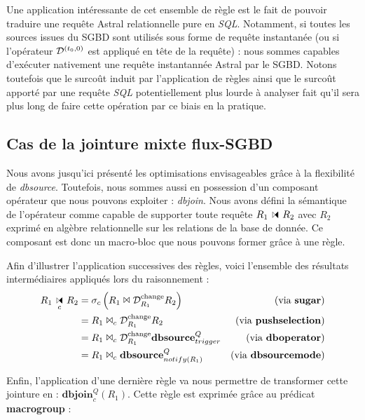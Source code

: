 Une application intéressante de cet ensemble de règle est le fait de pouvoir traduire une requête Astral relationnelle pure en \textit{SQL}. Notamment, si toutes les sources issues du SGBD sont utilisés sous forme de requête instantanée (ou si l'opérateur $\mathcal{D}^{(t_0,0)}$ est appliqué en tête de la requête) : nous sommes capables d'exécuter nativement une requête instantannée Astral par le SGBD. Notons toutefois que le surcoût induit par l'application de règles ainsi que le surcoût apporté par une requête \textit{SQL} potentiellement plus lourde à analyser fait qu'il sera plus long de faire cette opération par ce biais en la pratique.

\subsection{Cas de la jointure mixte flux-SGBD}\label{sec:contrib:asteroid:reecriture:join}
Nous avons jusqu'ici présenté les optimisations envisageables grâce à la flexibilité de \textit{dbsource}. Toutefois, nous sommes aussi en possession d'un composant opérateur que nous pouvons exploiter : \textit{dbjoin}. Nous avons défini la sémantique de l'opérateur comme capable de supporter toute requête $R_1\ssjoin R_2$ avec $R_2$ exprimé en algèbre relationnelle sur les relations de la base de donnée. Ce composant est donc un macro-bloc que nous pouvons former grâce à une règle.

Afin d'illustrer l'application successives des règles, voici l'ensemble des résultats intermédiaires appliqués lors du raisonnement :
\begin{align*} 
R_1\ssjoin_c R_2 &= \sigma_c \left(R_1 \Join \D^{\mathrm{change}}_{R_1} R_2\right) & \text{(via \textbf{sugar})}\\
& =  R_1 \Join_c \D^{\mathrm{change}}_{R_1} R_2 & \text{(via \textbf{pushselection})}\\
& =  R_1 \Join_c \D^{\mathrm{change}}_{R_1} \textbf{dbsource}_{trigger}^{Q} & \text{(via \textbf{dboperator})}\\
& =  R_1 \Join_c \textbf{dbsource}_{notify(R_1)}^{Q} & \text{(via \textbf{dbsourcemode})}
\end{align*}

Enfin, l'application d'une dernière règle va nous permettre de transformer cette jointure en : $\textbf{dbjoin}^Q_c (R_1)$. Cette règle est exprimée grâce au prédicat \textbf{macrogroup} :

